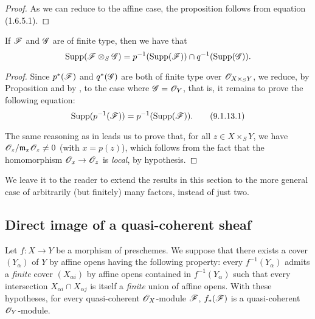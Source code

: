 \begin{proof}
\label{proof-1.9.1.12}
As we can reduce to the affine case, the proposition follows from
equation (1.6.5.1).
\end{proof}

\begin{cor}[9.1.13]
\label{1.9.1.13}
If $\mathscr{F}$ and $\mathscr{G}$ are of finite type, then we have that
\[
  {\mathop{\mathrm{Supp}}\nolimits}(\mathscr{F}\otimes_S\mathscr{G})=p^{-1}({\mathop{\mathrm{Supp}}\nolimits}(\mathscr{F}))\cap q^{-1}({\mathop{\mathrm{Supp}}\nolimits}(\mathscr{G})).
\]
\end{cor}

\begin{proof}
\label{proof-1.9.1.13}
Since $p^*(\mathscr{F})$ and $q^*(\mathscr{G})$ are both of finite type over
$\mathscr{O}_{X\times_S Y}$, we reduce, by Proposition  and
by , to the case where $\mathscr{G}=\mathscr{O}_Y$, that
is, it remains to prove the following equation:
\[
  {\mathop{\mathrm{Supp}}\nolimits}(p^{-1}(\mathscr{F}))=p^{-1}({\mathop{\mathrm{Supp}}\nolimits}(\mathscr{F})).
  \tag{9.1.13.1}
\]

The same reasoning as in  leads us to prove that, for all
$z\in X\times_S Y$, we have $\mathscr{O}_z/\mathfrak{m}_x\mathscr{O}_z\neq0$ (with $x=p(z)$),
which follows from the fact that the homomorphism $\OO_x\to\OO_z$ is \emph{local},
by hypothesis.
\end{proof}

We leave it to the reader to extend the results in this section to the more
general case of arbitrarily (but finitely) many factors, instead of just two.

\subsection{Direct image of a quasi-coherent sheaf}
\label{subsection-direct-image-of-qcoh}

\begin{prop}[9.2.1]
\label{1.9.2.1}
Let $f:X\to Y$ be a morphism of
preschemes. We suppose that there exists a cover $(Y_\alpha)$ of $Y$ by affine
opens having the following property: every $f^{-1}(Y_\alpha)$ admits a
\emph{finite} cover $(X_{\alpha i})$ by affine opens contained in
$f^{-1}(Y_\alpha)$ such that every intersection $X_{\alpha i}\cap X_{\alpha j}$
is itself a \emph{finite} union of affine opens. With these hypotheses, for
every quasi-coherent $\mathscr{O}_X$-module $\mathscr{F}$, $f_*(\mathscr{F})$ is a
quasi-coherent $\mathscr{O}_Y$-module.
\end{prop}

